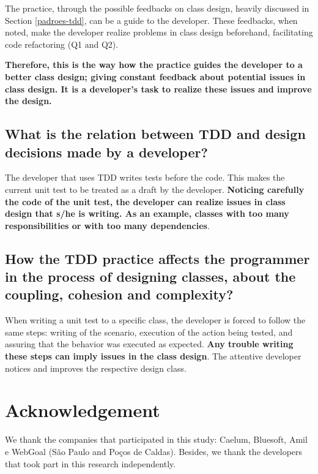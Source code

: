 \documentclass[times]{elsarticle}
\begin{document}
The practice, through the possible feedbacks on class design, heavily
discussed in Section \ref{padroes-tdd}, can be a guide to the developer.
These feedbacks, when noted, make the developer realize problems in class
design beforehand, facilitating code refactoring (Q1 and Q2).

\textbf{Therefore, this is the way how the practice guides the developer to
a better class design; giving constant feedback about potential issues in
class design. It is a developer's task to realize these issues and 
improve the design. }

\subsection{What is the relation between TDD and design decisions made by
a developer?}

The developer that uses TDD writes tests before the code. This makes
the current unit test to be treated as a draft by the developer.
\textbf{Noticing carefully the code of the unit test, the developer can
realize issues in class design that s/he is writing. As an example,
classes with too many responsibilities or with too many dependencies}.

\subsection{How the TDD practice affects the programmer in the process of designing
classes, about the coupling, cohesion and complexity?}

When writing a unit test to a specific class, the developer is forced to follow
the same steps: writing of the scenario, execution of the action being
tested, and assuring that the behavior was executed as
expected.
\textbf{Any trouble writing these steps can imply issues in the class design}. 
The attentive developer notices and improves the respective design class.

\section*{Acknowledgement}

We thank the companies that participated in this study: Caelum, Bluesoft,
Amil e WebGoal (São Paulo and Poços de Caldas). Besides, we thank the
developers that took part in this research independently.
\end{document}
